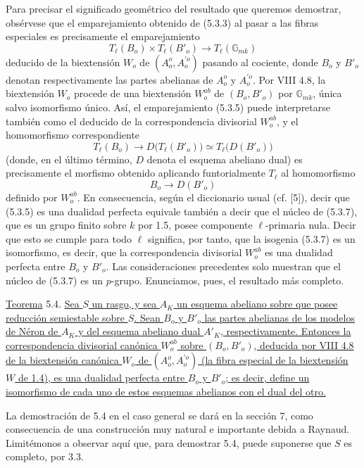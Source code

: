 Para precisar el significado geométrico del resultado que queremos
demostrar, obsérvese que el emparejamiento obtenido de (5.3.3) al pasar
a las fibras especiales es precisamente el emparejamiento
\begin{equation}\tag{5.3.5}
 T_\ell(B_o)\times T_\ell(B'_o)
 \longrightarrow T_\ell(\mathbb G_{mk})
\end{equation}
deducido de la biextensión $W_o$ de $(A_o^o,A_o^{\prime o})$ pasando
al cociente, donde $B_o$ y $B'_o$ denotan respectivamente las partes
abelianas de $A_o^o$ y $A_o^{\prime o}$. Por VIII 4.8, la biextensión
$W_o$ procede de una biextensión $W_o^{ab}$ de $(B_o,B'_o)$ por
$\mathbb G_{mk}$, única salvo isomorfismo único. Así, el emparejamiento
(5.3.5) puede interpretarse también como el deducido de la
correspondencia divisorial $W_o^{ab}$, y el homomorfismo correspondiente
\begin{equation}\tag{5.3.6}
 T_\ell(B_o)
 \longrightarrow D\bigl(T_\ell(B'_o)\bigr)
 \simeq T_\ell\bigl(D(B'_o)\bigr)
\end{equation}
(donde, en el último término, $D$ denota el esquema abeliano dual) es
precisamente el morfismo obtenido aplicando funtorialmente $T_\ell$ al
homomorfismo
\begin{equation}\tag{5.3.7}
 B_o\longrightarrow D(B'_o)
\end{equation}
definido por $W_o^{ab}$. En consecuencia, según el diccionario usual
(cf. [5]), decir que (5.3.5) es una dualidad perfecta equivale también
a decir que el núcleo de (5.3.7), que es un grupo finito sobre $k$ por
1.5, posee componente $\ell$-primaria nula. Decir que esto se cumple
para todo $\ell$ significa, por tanto, que la isogenia (5.3.7) es un
isomorfismo, es decir, que la correspondencia divisorial $W_o^{ab}$ es
una dualidad perfecta entre $B_o$ y $B'_o$. Las consideraciones
precedentes solo muestran que el núcleo de (5.3.7) es un $p$-grupo.
Enunciamos, pues, el resultado más completo.

\medskip
\noindent
\underline{Teorema} 5.4. \underline{Sea $S$ un rasgo, y sea $A_K$ un
esquema abeliano sobre  que posee reducción semiestable
sobre $S$. Sean $B_o$ y $B'_o$ las partes abelianas de los modelos de
Néron de $A_K$ y del esquema abeliano dual $A'_K$, respectivamente.
Entonces la correspondencia divisorial canónica $W_o^{ab}$ sobre
$(B_o,B'_o)$, deducida por VIII 4.8 de la biextensión canónica $W_o$ de
$(A_o^o,A_o^{\prime o})$ (la fibra especial de la biextensión $W$ de
1.4), es una dualidad perfecta entre $B_o$ y $B'_o$; es decir, define
un isomorfismo de cada uno de estos esquemas abelianos con el dual del
otro.}

La demostración de 5.4 en el caso general se dará en la sección 7, como
consecuencia de una construcción muy natural e importante debida a
Raynaud. Limitémonos a observar aquí que, para demostrar 5.4, puede
suponerse que $S$ es completo, por 3.3.
